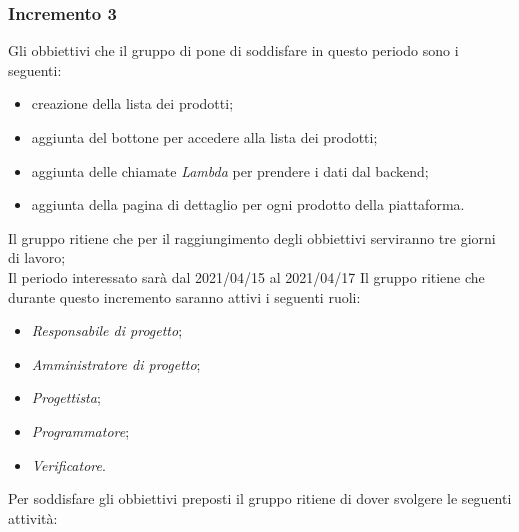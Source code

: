 \subsubsection{Incremento 3}
Gli obbiettivi che il gruppo di pone di soddisfare in questo periodo sono i seguenti:
\begin{itemize}
    \item creazione della lista dei prodotti;
    \item aggiunta del bottone per accedere alla lista dei prodotti;
    \item aggiunta delle chiamate \textit{Lambda} per prendere i dati dal backend;
    \item aggiunta della pagina di dettaglio per ogni prodotto della piattaforma.
\end{itemize}
Il gruppo ritiene che per il raggiungimento degli obbiettivi serviranno tre giorni di lavoro;\\
Il periodo interessato sarà dal 2021/04/15 al 2021/04/17
Il gruppo ritiene che durante questo incremento saranno attivi i seguenti ruoli:
\begin{itemize}
    \item \textit{Responsabile di progetto};
    \item \textit{Amministratore di progetto};
    \item \textit{Progettista};
    \item \textit{Programmatore};
    \item \textit{Verificatore}.
\end{itemize}
Per soddisfare gli obbiettivi preposti il gruppo ritiene di dover svolgere le seguenti attività:
